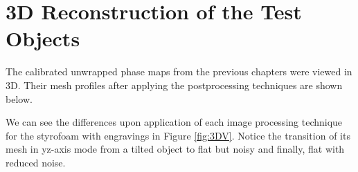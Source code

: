\section{3D Reconstruction of the Test Objects}

The calibrated unwrapped phase maps from the previous chapters were viewed in 3D. Their mesh profiles after applying the postprocessing techniques are shown below. 

We can see the differences upon application of each image processing technique for the styrofoam with engravings in Figure \ref{fig:3DV}. 
Notice the transition of its mesh in yz-axis mode from a tilted object to flat but noisy and finally, flat with reduced noise.

